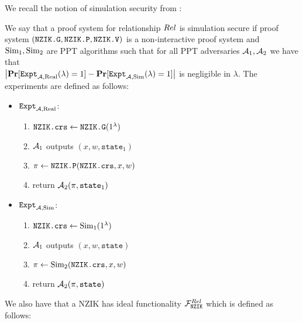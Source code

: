 We recall the notion of simulation security from \cite{sahai1999non}:

\begin{definition}
	We say that a proof system for relationship $Rel$ is simulation secure if proof system
	$(\texttt{NZIK.G}, \texttt{NZIK.P}, \texttt{NZIK.V})$ is a non-interactive proof system and $\text{Sim}_1, \text{Sim}_2$ are PPT algorithms
	such that for all PPT adversaries $\mathcal{A}_1, \mathcal{A}_2$ we have that \\
	$ \left|\operatorname*{\mathbf{Pr}}[\texttt{Expt}_{\mathcal{A}, \text{Real}}(\lambda) = 1] - \operatorname*{\mathbf{Pr}}[\texttt{Expt}_{\mathcal{A}, \text{Sim}}(\lambda) = 1]\right|$ is negligible in $\lambda$.
	The experiments are defined as follows:
	\begin{itemize}
		\item $\texttt{Expt}_{\mathcal{A}, \text{Real}}$:
		\begin{enumerate}
			\item $\texttt{NZIK.crs} \gets \texttt{NZIK.G}(1^\lambda)$
			\item $\mathcal{A}_1$ outputs $(x, w, \texttt{state}_1)$
			\item $\pi \gets \texttt{NZIK.P}(\texttt{NZIK.crs}, x, w)$
			\item return $\mathcal{A}_2(\pi, \texttt{state}_1)$
		\end{enumerate}
		\item $\texttt{Expt}_{\mathcal{A}, \text{Sim}}$:
		\begin{enumerate}
			\item $\texttt{NZIK.crs} \gets \text{Sim}_1(1^\lambda)$
			\item $\mathcal{A}_1$ outputs $(x, w, \texttt{state})$
			\item $\pi \gets \text{Sim}_2(\texttt{NZIK.crs}, x, w)$
			\item return $\mathcal{A}_2(\pi, \texttt{state})$
		\end{enumerate}
	\end{itemize}
\end{definition}

We also have that a NZIK has ideal functionality $\mathcal{F}_{\texttt{NZIK}}^{Rel}$ which is defined as follows:
\begin{figure}[H]
\end{figure}

